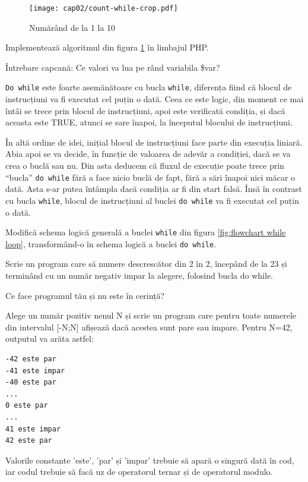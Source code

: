 \begin{figure}[ht!]
  \centering
    \texttt{[image: cap02/count-while-crop.pdf]}
  \caption{Numărând de la 1 la 10}
  \label{fig:while counting}
\end{figure}

\begin{Exercise}[title={Numărătoarea din 1 în 1 cu while},difficulty=1]
\ExePart
Implementează algoritmul din figura \ref{fig:while counting} în limbajul PHP.

\ExePart
Întrebare capcană: Ce valori va lua pe rând variabila \$var?
\end{Exercise}

\texttt{Do while} este foarte asemănătoare cu bucla \texttt{while},
diferența fiind că blocul de instrucțiuni va fi executat cel
puțin o dată. Ceea ce este logic, din moment ce mai întâi se
trece prin blocul de instrucțiuni, apoi este verificată condiția, și
dacă aceasta este TRUE, atunci se sare înapoi, la începutul blocului de
instrucțiuni.

În altă ordine de idei, inițial blocul de instrucțiuni
face parte din execuția liniară. Abia apoi se va decide, în funcție de valoarea
de adevăr a condiției, dacă se va crea o buclă sau nu. Din asta deducem
că fluxul de execuție poate trece prin ``bucla'' \texttt{do while} fără
a face nicio buclă de fapt, fără a sări înapoi nici măcar o dată. Asta s-ar putea
întâmpla dacă condiția ar fi din start falsă. Însă în contrast cu bucla
\texttt{while}, blocul de instrucțiuni al buclei \texttt{do while} va fi executat cel
puțin o dată.

\begin{Exercise}[title={Schema logică a buclei do while},difficulty=1]
Modifică schema logică generală a buclei \texttt{while} din
figura \ref{fig:flowchart while loop}, transformând-o în
schema logică a buclei \texttt{do while}.
\end{Exercise}


\begin{Exercise}[title={Numărătoarea din doi în doi cu do while},difficulty=1]
\ExePart
Scrie un program care să numere descrescător din 2 în 2, începând de la 23
și terminând cu un număr negativ impar la alegere, folosind bucla do while.

\ExePart
Ce face programul tău și nu este în cerință?
\end{Exercise}

\begin{Exercise}[title={Par sau impar?},difficulty=2]
Alege un număr pozitiv nenul N și scrie un program care
pentru toate numerele din intervalul [-N;N] afișează dacă acestea sunt pare
sau impare. Pentru N=42, outputul va arăta astfel:
\begin{verbatim}
-42 este par
-41 este impar
-40 este par
...
0 este par
...
41 este impar
42 este par
\end{verbatim}
Valorile constante 'este', 'par' și 'impar' trebuie să apară o singură dată în
cod, iar codul trebuie să facă uz de operatorul ternar și de operatorul modulo.
\end{Exercise}

